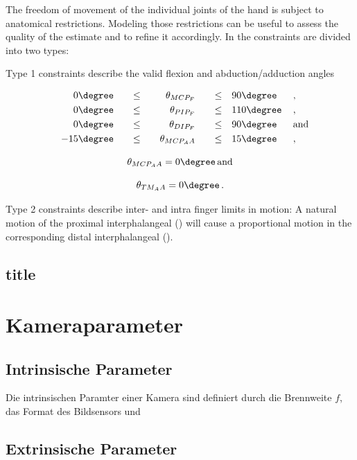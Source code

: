 	The freedom of movement of the individual joints of the hand is subject to anatomical restrictions. Modeling those restrictions can be useful to assess the quality of the estimate and to refine it accordingly. In \cite{Lin2000} the constraints are divided into two types: 
	
	Type 1 constraints describe the valid flexion and abduction/adduction angles
	
	\begin{alignat}{7}
		&&0\degree \quad &&\leq \quad &&\theta_{MCP_F} \quad &&\leq \quad &90\degree\, &&,\\
		&&0\degree \quad &&\leq \quad &&\theta_{PIP_F} \quad &&\leq \quad &110\degree\,&& ,\\
		&&0\degree \quad &&\leq \quad &&\theta_{DIP_F} \quad &&\leq \quad &90\degree\, && \text{and}\\
		&&-15\degree \quad &&\leq \quad &&\theta_{MCP_AA} \quad &&\leq \quad &15\degree\, &&,
	\end{alignat}
	
	\begin{equation}
	\theta_{MCP_AA} = 0\degree\, \text{and}
	\end{equation}

	\begin{equation}
	\theta_{TM_AA} = 0\degree\,.
	\end{equation}
	
	Type 2 constraints describe inter- and intra finger limits in motion:
	A natural motion of the proximal interphalangeal () will cause a proportional motion in the corresponding distal interphalangeal ().
	\subsection{title}
	
	
\section{Kameraparameter}
\subsection{Intrinsische Parameter}
Die intrinsischen Paramter einer Kamera sind definiert durch die Brennweite $f$, das Format des Bildsensors und 
\subsection{Extrinsische Parameter}

